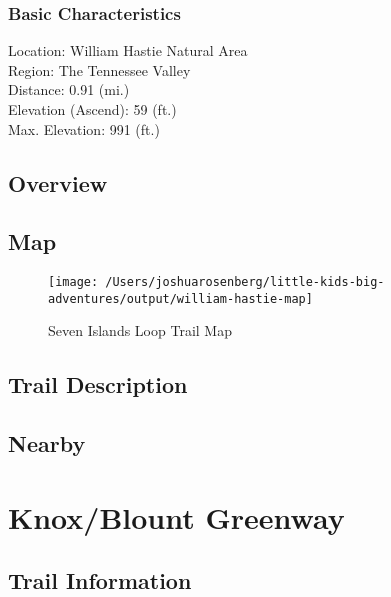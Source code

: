 \documentclass[
]{book}
\begin{document}
\hypertarget{basic-characteristics-2}{%
\subsection{Basic Characteristics}\label{basic-characteristics-2}}

Location: William Hastie Natural Area\\
Region: The Tennessee Valley\\
Distance: 0.91 (mi.)\\
Elevation (Ascend): 59 (ft.)\\
Max. Elevation: 991 (ft.)

\hypertarget{overview-2}{%
\section{Overview}\label{overview-2}}

\hypertarget{map-2}{%
\section{Map}\label{map-2}}

\begin{figure}
\texttt{[image: /Users/joshuarosenberg/little-kids-big-adventures/output/william-hastie-map]} \caption{Seven Islands Loop Trail Map}\label{fig:unnamed-chunk-13}
\end{figure}

\hypertarget{trail-description-2}{%
\section{Trail Description}\label{trail-description-2}}

\hypertarget{nearby-2}{%
\section{Nearby}\label{nearby-2}}

\hypertarget{knoxblount-greenway}{%
\chapter{Knox/Blount Greenway}\label{knoxblount-greenway}}

\hypertarget{trail-information-3}{%
\section{Trail Information}\label{trail-information-3}}
\end{document}

